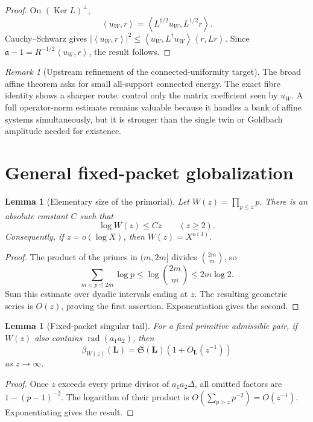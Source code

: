 \documentclass[11pt]{article}
\newtheorem{lemma}[theorem]{Lemma}
\theoremstyle{definition}
\theoremstyle{remark}
\newtheorem{remark}[theorem]{Remark}
\newcommand{\Ker}{\operatorname{Ker}}
\newcommand{\rad}{\operatorname{rad}}
\newcommand{\ip}[2]{\left\langle#1,#2\right\rangle}
\begin{document}
\begin{proof}
On $(\Ker L)^\perp$,
\[
 \ip{u_W}{r}
 =\ip{L^{\dagger/2}u_W}{L^{1/2}r}.
\]
Cauchy--Schwarz gives
$|\ip{u_W}{r}|^2\le
\ip{u_W}{L^\dagger u_W}\ip{r}{Lr}$.
Since
$\mathfrak a-1=R^{-1/2}\ip{u_W}{r}$, the result follows.
\end{proof}

\begin{remark}[Upstream refinement of the connected-uniformity target]
The broad affine theorem asks for small all-support connected energy.  The
exact fibre identity shows a sharper route: control only the matrix coefficient
seen by $u_W$.  A full operator-norm estimate remains valuable because it
handles a bank of affine systems simultaneously, but it is stronger than the
single twin or Goldbach amplitude needed for existence.
\end{remark}

\section{General fixed-packet globalization}
\label{sec:fixed-globalization}

\begin{lemma}[Elementary size of the primorial]
\label{lem:primorial}
Let $W(z)=\prod_{p\le z}p$.  There is an absolute constant $C$ such that
\[
 \boxed{\log W(z)\le Cz\qquad(z\ge2).}
 \tag{10.1}
\]
Consequently, if $z=o(\log X)$, then $W(z)=X^{o(1)}$.
\end{lemma}

\begin{proof}
The product of the primes in $(m,2m]$ divides $\binom{2m}{m}$, so
\[
 \sum_{m<p\le2m}\log p\le\log\binom{2m}{m}\le2m\log2.
\]
Sum this estimate over dyadic intervals ending at $z$.  The resulting geometric
series is $O(z)$, proving the first assertion.  Exponentiation gives the
second.
\end{proof}

\begin{lemma}[Fixed-packet singular tail]
\label{lem:fixed-tail}
For a fixed primitive admissible pair, if $W(z)$ also contains
$\rad(a_1a_2)$, then
\[
 \boxed{\beta_{W(z)}(\bm L)=\mathfrak S(\bm L)(1+O_{\bm L}(z^{-1}))}
 \tag{10.2}
\]
as $z\to\infty$.
\end{lemma}

\begin{proof}
Once $z$ exceeds every prime divisor of $a_1a_2\Delta$, all omitted factors are
$1-(p-1)^{-2}$.  The logarithm of their product is
$O(\sum_{p>z}p^{-2})=O(z^{-1})$.  Exponentiating gives the result.
\end{proof}
\end{document}
